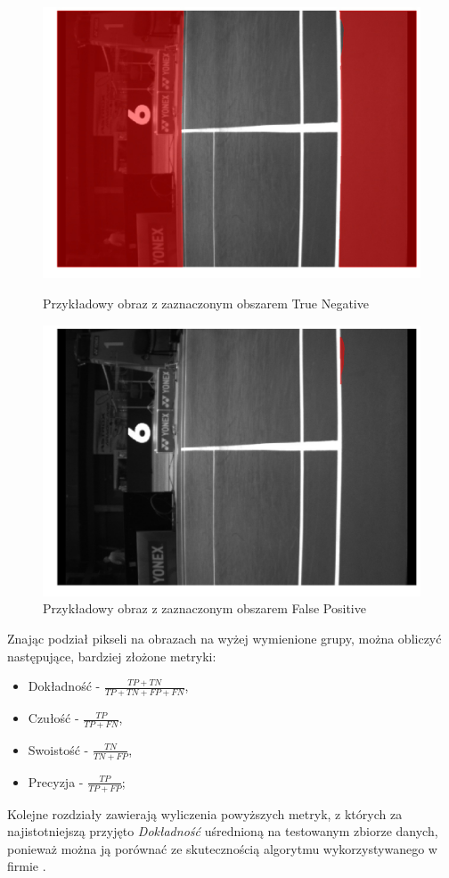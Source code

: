 \begin{figure}[!htb]
    \includegraphics[width=\linewidth]{TN_frame_8.jpg}
    \caption{Przykładowy obraz z zaznaczonym obszarem True Negative}
    \label{fig:TN}
  \endminipage\hfill
    \includegraphics[width=\linewidth]{FP_frame_8.jpg}
    \caption{Przykładowy obraz z zaznaczonym obszarem False Positive}
    \label{fig:FP}
  \endminipage\hfill
\end{figure}

Znając podział pikseli na obrazach na wyżej wymienione grupy, można obliczyć następujące, bardziej złożone metryki:

\begin{itemize}
  \label{sec:miary}
  \item Dokładność - $ \frac{TP + TN}{TP + TN + FP + FN} $,
  \item Czułość - $ \frac{TP}{TP + FN} $,
  \item Swoistość - $ \frac{TN}{TN + FP} $,
  \item Precyzja - $ \frac{TP}{TP + FP} $;
\end{itemize}

Kolejne rozdziały zawierają wyliczenia powyższych metryk, z których za najistotniejszą przyjęto \textit{Dokładność} uśrednioną na testowanym zbiorze danych, ponieważ można ją porównać ze skutecznością algorytmu wykorzystywanego w firmie \blue{}.

